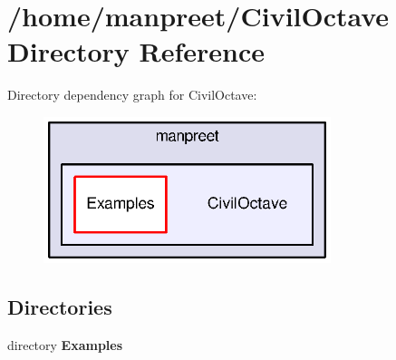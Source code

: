 \section{/home/manpreet/\-Civil\-Octave Directory Reference}
\label{dir_781c86ae54d8e3a9d7c4eb1e90fa1231}
Directory dependency graph for Civil\-Octave\-:
\nopagebreak
\begin{figure}[H]
\begin{center}
\leavevmode
\includegraphics[width=238pt]{dir_781c86ae54d8e3a9d7c4eb1e90fa1231_dep}
\end{center}
\end{figure}
\subsection*{Directories}
\begin{DoxyCompactItemize}
\item 
directory {\bf Examples}
\end{DoxyCompactItemize}

